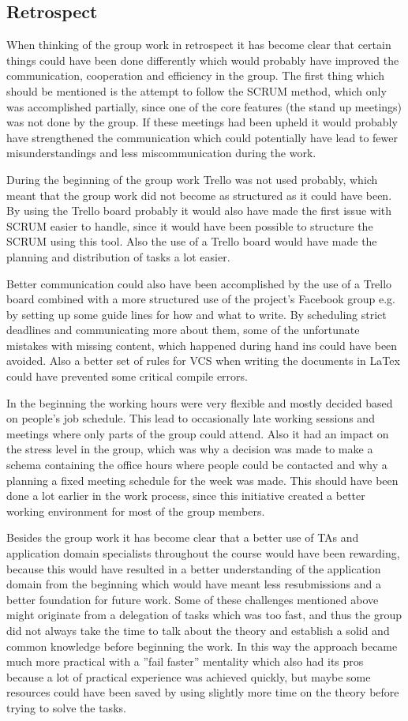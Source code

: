 \subsection{Retrospect}
When thinking of the group work in retrospect it has become clear that certain things could have been done differently which would probably have improved the communication, cooperation and efficiency in the group.
The first thing which should be mentioned is the attempt to follow the SCRUM method, which only was accomplished partially, since one of the core features (the stand up meetings) was not done by the group. If these meetings had been upheld it would probably have strengthened the communication which could potentially have lead to fewer misunderstandings and less miscommunication during the work.

During the beginning of the group work Trello was not used probably, which meant that the group work did not become as structured as it could have been. By using the Trello board probably it would also have made the first issue with SCRUM easier to handle, since it would have been possible to structure the SCRUM using this tool. Also the use of a Trello board would have made the planning and distribution of tasks a lot easier.

Better communication could also have been accomplished by the use of a Trello board combined with a more structured use of the project's  Facebook group e.g. by setting up some guide lines for how and what to write. By scheduling strict deadlines and communicating more about them, some of the unfortunate mistakes with missing content, which happened during hand ins could have been avoided. Also a better set of rules for VCS when writing the documents in LaTex could have prevented some critical compile errors.

In the beginning the working hours were very flexible and mostly decided based on people's job schedule. This lead to occasionally  late working sessions and meetings where only parts of the group could attend. Also it had an impact on the stress level in the group, which was why a decision was made to make a schema containing the office hours where people could be contacted and why a planning a fixed meeting schedule for the week was made. This should have been done a lot earlier in the work process, since this initiative created a better working environment for most of the group members.

Besides the group work it has become clear that a better use of TAs and application domain specialists throughout the course would have been rewarding, because this would have resulted in a better understanding of the application domain from the beginning which would have meant less resubmissions and a better foundation for future work. 
Some of these challenges mentioned above might originate from a delegation of tasks which was too fast, and thus the group did not always take the time to talk about the theory and establish a solid and common knowledge before beginning the work. In this way the approach became much more practical with a ''fail faster'' mentality which also had its pros because a lot of practical experience was achieved quickly, but maybe some resources could have been saved by using slightly more time on the theory before trying to solve the tasks.
